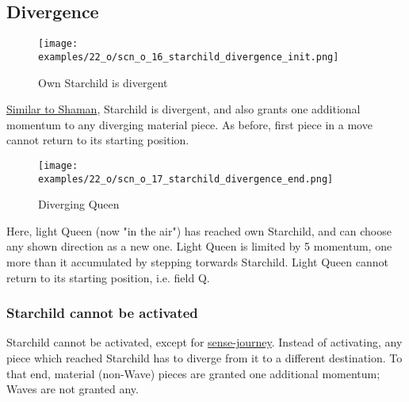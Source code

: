 \subsection*{Divergence}
\label{sec:One/Starchild/Divergence}

\vspace*{-1.4\baselineskip}
\noindent
\begin{figure}[!h]
\texttt{[image: examples/22\_o/scn\_o\_16\_starchild\_divergence\_init.png]}
\vspace*{-1.3\baselineskip}
\caption{Own Starchild is divergent}
\label{fig:scn_o_16_starchild_divergence_init}
\end{figure}

\vspace*{-0.4\baselineskip}
\hyperref[fig:scn_cot_11_own_shaman_is_divergent_init]{Similar to Shaman},
Starchild is divergent, and also grants one additional momentum to any diverging
material piece. As before, first piece in a move cannot return to its starting
position.

\vspace*{-0.7\baselineskip}
\noindent
\begin{figure}[!h]
\texttt{[image: examples/22\_o/scn\_o\_17\_starchild\_divergence\_end.png]}
\vspace*{-1.3\baselineskip}
\caption{Diverging Queen}
\label{fig:scn_o_17_starchild_divergence_end}
\end{figure}

\vspace*{-0.4\baselineskip}
Here, light Queen (now "in the air") has reached own Starchild, and can choose any
shown direction as a new one. Light Queen is limited by 5 momentum, one more than it
accumulated by stepping torwards Starchild. Light Queen cannot return to its starting
position, i.e. field Q.

\clearpage %

\subsubsection*{Starchild cannot be activated}
\label{sec:One/Starchild/Divergence/Starchild cannot be activated}

\vspace*{-0.7\baselineskip}
Starchild cannot be activated, except for
\hyperref[sec:One/Starchild/Sense-journey]{sense-journey}.
Instead of activating, any piece which reached Starchild has to diverge from it to
a different destination. To that end, material (non-Wave) pieces are granted one
additional momentum; Waves are not granted any. %

